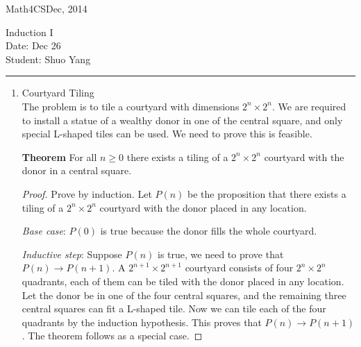 \documentclass[11pt]{article}
\def\CourseCode{Math4CS}
\def\DateHandedOut{Dec, 2014}
\def\DateDue{Dec 26}
\def\Author{Shuo Yang}
\begin{document}
\noindent

\CourseCode \hfill \DateHandedOut

\begin{center}
Induction I\\
Date: \DateDue\\
Student: \Author\\
\end{center}

\hrule\smallskip

\begin{enumerate}

\item Courtyard Tiling\\
  The problem is to tile a courtyard with dimensions $2^n \times
  2^n$. We are required to install a statue of a wealthy donor in one
  of the central square, and only special L-shaped tiles can be
  used. We need to prove this is feasible.
  
  \textbf{Theorem} For all $n \geq 0$ there exists a tiling of a $2^n
  \times 2^n$ courtyard with the donor in a central square. 
  \begin{proof}
    Prove by induction. Let $P(n)$ be the proposition that there
    exists a tiling of a $2^n \times 2^n$ courtyard with the donor
    placed in any location.

  \emph{Base case}: $P(0)$ is true because the donor fills the whole
  courtyard.

  \emph{Inductive step}: Suppose $P(n)$ is true, we need to prove that
  $P(n) \rightarrow P(n+1)$. A $2^{n+1} \times 2^{n+1}$ courtyard
  consists of four $2^n \times 2^n$ quadrants, each of them can be tiled
  with the donor placed in any location. Let the donor be in one of
  the four central squares, and the remaining three central squares
  can fit a L-shaped tile. Now we can tile each of the four quadrants
  by the induction hypothesis. This proves that $P(n) \rightarrow
  P(n+1)$. The theorem follows as a special case.
  \end{proof}

\end{enumerate}
\end{document}
